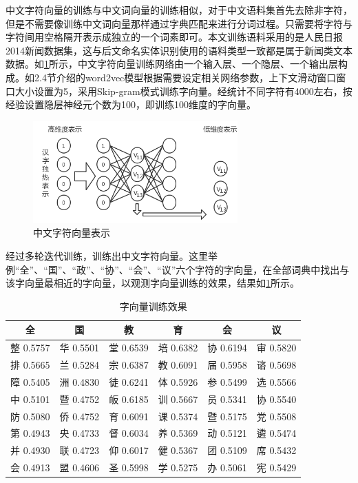 \documentclass[winfonts,master,oneside,nobackinfo]{njuthesis}
\begin{document}
中文字符向量的训练与中文词向量的训练相似，对于中文语料集首先去除非字符，但是不需要像训练中文词向量那样通过字典匹配来进行分词过程。只需要将字符与字符间用空格隔开表示成独立的一个词素即可。本文训练语料采用的是人民日报2014新闻数据集，这与后文命名实体识别使用的语料类型一致都是属于新闻类文本数据。如\ref{char2vec}所示，中文字符向量训练网络由一个输入层、一个隐层、一个输出层构成。如2.4节介绍的word2vec模型根据需要设定相关网络参数，上下文滑动窗口窗口大小设置为5，采用Skip-gram模式训练字向量。经统计不同字符有4000左右，按经验设置隐层神经元个数为100，即训练100维度的字向量。

\begin{figure}[h]
\centering
\includegraphics[width=0.7\textwidth]{./figure/char2vec.jpg}
\caption{中文字符向量表示}
\label{char2vec}
\end{figure}

经过多轮迭代训练，训练出中文字符向量。这里举例“全”、“国”、“政”、“协”、“会”、“议”六个字符的字向量，在全部词典中找出与该字向量最相近的字向量，以观测字向量训练的效果，结果如\ref{char_embedding}所示。

\begin{table}[h]
\centering
\begin{tabular}{cccccc} %
\hline 
全& 国& 教& 育& 会& 议\\
\hline  
整 0.5757& 华 0.5501& 堂 0.6539& 培 0.6382&协 0.6194&审 0.5820\\
排 0.5665& 兰 0.5284& 宗 0.6387& 教 0.6091&届 0.5958&谘 0.5698\\
障 0.5405& 洲 0.4830& 徒 0.6241& 体 0.5926&参 0.5499&选 0.5566\\
中 0.5101& 暨 0.4752& 皈 0.6185& 训 0.5667&员 0.5341&协 0.5540\\
防 0.5080& 侨 0.4752& 育 0.6091& 课 0.5374&暨 0.5175&党 0.5508\\
第 0.4943& 央 0.4733& 督 0.6034& 养 0.5369&动 0.5121&遴 0.5474\\
并 0.4930& 联 0.4723& 仰 0.6017& 健 0.5367&团 0.5109&席 0.5432\\
会 0.4913& 盟 0.4606& 圣 0.5998& 学 0.5275&办 0.5061&宪 0.5429\\
\hline 
\end{tabular}
\caption{字向量训练效果}
\label{char_embedding}
\end{table}
\end{document}
